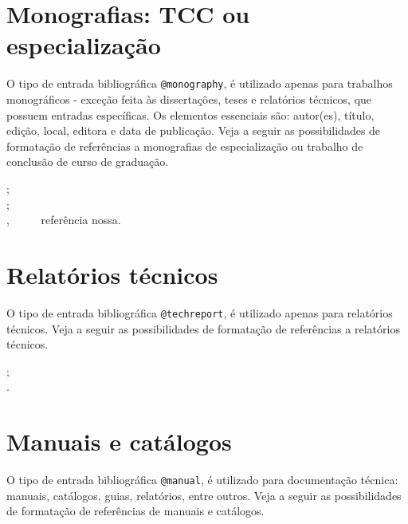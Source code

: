 \begin{apendicesenv}
\section{Monografias: TCC ou especialização}
\label{sec:monography}

O tipo de entrada bibliográfica \verb|@monography|, é utilizado apenas para trabalhos monográficos - exceção feita às dissertações, teses e relatórios técnicos, que possuem entradas específicas. Os elementos essenciais são: autor(es), título, edição, local, editora e data de publicação. Veja a seguir as possibilidades de formatação de referências a monografias de especialização ou trabalho de conclusão de curso de graduação.

{\small
	\cite{morgado1990} ;\\
	\cite{morgado1990b} ;\\
	\cite{Silva2013} ,   \ \ \ \ \ referência nossa.\\
}



\section{Relatórios técnicos}
\label{sec:techreport}


O tipo de entrada bibliográfica \verb|@techreport|, é utilizado apenas para relatórios técnicos. Veja a seguir as possibilidades de formatação de referências a relatórios técnicos.

{\small
	\cite{biblioteca1983} ;\\
	\cite{biblioteca1985}.\\
}



\section{Manuais e catálogos}
\label{sec:manual}


O tipo de entrada bibliográfica \verb|@manual|, é utilizado para documentação técnica: manuais, catálogos, guias, relatórios, entre outros. Veja a seguir as possibilidades de formatação de referências de manuais e catálogos.


\end{apendicesenv}
